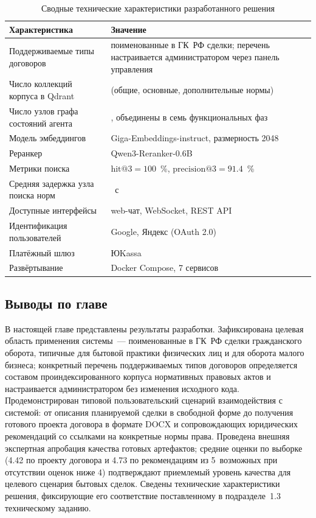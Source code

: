 \begin{table}[H]
\caption{Сводные технические характеристики разработанного решения}
\label{tab:tech-summary}
\renewcommand{\arraystretch}{1.20}
\begin{tabularx}{\textwidth}{|>{\raggedright\arraybackslash}X|>{\raggedright\arraybackslash}X|} \hline
\textbf{Характеристика} & \textbf{Значение} \\ \hline
Поддерживаемые типы договоров & поименованные в ГК~РФ сделки; перечень настраивается администратором через панель управления \\ \hline
Число коллекций корпуса в Qdrant & 3 (общие, основные, дополнительные нормы) \\ \hline
Число узлов графа состояний агента & 21, объединены в семь функциональных фаз \\ \hline
Модель эмбеддингов & Giga-Embeddings-instruct, размерность 2048 \\ \hline
Реранкер & Qwen3-Reranker-0.6B \\ \hline
Метрики поиска & $\mathrm{hit}@3 = 100$~\%, $\mathrm{precision}@3 = 91.4$~\% \\ \hline
Средняя задержка узла поиска норм & 13.6~с \\ \hline
Доступные интерфейсы & web-чат, WebSocket, REST API \\ \hline
Идентификация пользователей & Google, Яндекс (OAuth 2.0) \\ \hline
Платёжный шлюз & ЮKassa \\ \hline
Развёртывание & Docker Compose, 7 сервисов \\ \hline
\end{tabularx}
\end{table}

\subsection{Выводы по главе}

В настоящей главе представлены результаты разработки. Зафиксирована целевая область применения системы~--- поименованные в ГК~РФ сделки гражданского оборота, типичные для бытовой практики физических лиц и для оборота малого бизнеса; конкретный перечень поддерживаемых типов договоров определяется составом проиндексированного корпуса нормативных правовых актов и настраивается администратором без изменения исходного кода. Продемонстрирован типовой пользовательский сценарий взаимодействия с системой: от описания планируемой сделки в свободной форме до получения готового проекта договора в формате DOCX и сопровождающих юридических рекомендаций со ссылками на конкретные нормы права. Проведена внешняя экспертная апробация качества готовых артефактов; средние оценки по выборке (4.42 по проекту договора и 4.73 по рекомендациям из 5~возможных при отсутствии оценок ниже 4) подтверждают приемлемый уровень качества для целевого сценария бытовых сделок. Сведены технические характеристики решения, фиксирующие его соответствие поставленному в подразделе~1.3 техническому заданию.